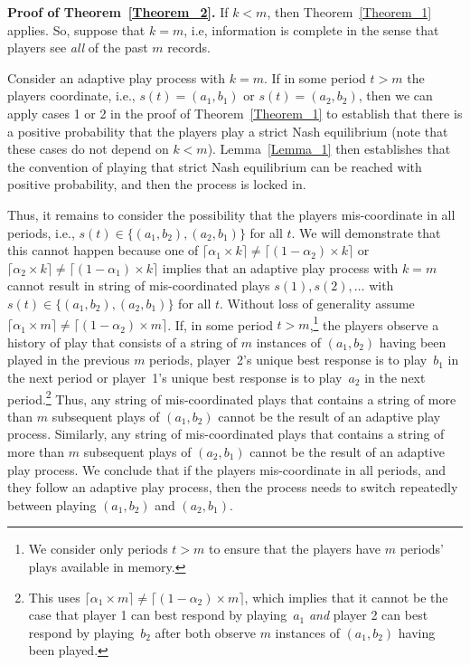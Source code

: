 \documentclass[11.5pt]{article}
\begin{document}
\textbf{Proof of Theorem~\ref{Theorem_2}.}
If $k<m$, then Theorem~\ref{Theorem_1} applies. So, suppose that $k=m$, i.e, information is complete in the sense that players see \emph{all} of the past $m$ records.

Consider an adaptive play process with $k=m$. If in some period $t>m$ the players coordinate, i.e., $s(t)=(a_1,b_1)$ or $s(t)=(a_2,b_2)$, then we can apply cases 1 or 2 in the proof of Theorem~\ref{Theorem_1} to establish that there is a positive probability that the players play a strict Nash equilibrium (note that these cases do not depend on $k < m$). 
Lemma~\ref{Lemma_1} then establishes that the convention of playing that strict Nash equilibrium can be reached with positive probability, and then the process is locked in.

Thus, it remains to consider the possibility that the players mis-coordinate in all periods, i.e., $s(t)\in \{(a_1,b_2),(a_2,b_1)\}$ for all $t$. We will demonstrate that this cannot happen because one of $\lceil\alpha_1\times k\rceil \neq \lceil (1-\alpha_2)\times k\rceil$ or $\lceil\alpha_2\times k\rceil \neq \lceil (1-\alpha_1)\times k\rceil$ implies that an adaptive play process with $k=m$ cannot result in string of mis-coordinated plays $s(1),s(2), \ldots $ with $s(t)\in \{(a_1,b_2),(a_2,b_1)\}$ for all $t$. 
%
Without loss of generality assume $\lceil \alpha_1\times m\rceil \neq\lceil (1-\alpha_2)\times m\rceil$. If, in some period $t>m$,\footnote{We consider only periods $t>m$ to ensure that the players have $m$ periods' plays available in memory.} the players observe a history of play that consists of a string of $m$ instances of $(a_1,b_2)$ having been played in the previous $m$ periods, player~2's unique best response is to play~$b_1$ in the next period or player~1's unique best response is to play~$a_2$ in the next period.\footnote{This uses $\lceil \alpha_1\times m\rceil \neq\lceil (1-\alpha_2)\times m\rceil$, which implies that it cannot be the case that player 1 can best respond by playing~$a_1$ \emph{and} player 2 can best respond by playing~$b_2$ after both observe $m$ instances of $(a_1,b_2)$ having been played.} 
%
Thus, any string of mis-coordinated plays that contains a string of more than $m$ subsequent plays of $(a_1,b_2)$ cannot be the result of an adaptive play process. 
%
Similarly, any string of mis-coordinated plays that contains a string of more than $m$ subsequent plays of $(a_2,b_1)$ cannot be the result of an adaptive play process. 
%
We conclude that if the players mis-coordinate in all periods, and they follow an adaptive play process, then the process needs to switch repeatedly between playing $(a_1,b_2)$ and $(a_2,b_1)$. 
%
\end{document}
